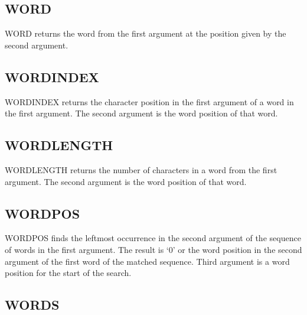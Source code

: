 

\subsection{WORD}\label{word}

WORD returns the word from the first argument at the position given by
the second argument.



\subsection{WORDINDEX}\label{wordindex}

WORDINDEX returns the character position in the first argument of a word
in the first argument. The second argument is the word position of that
word.



\subsection{WORDLENGTH}\label{wordlength}

WORDLENGTH returns the number of characters in a word from the first
argument. The second argument is the word position of that word.



\subsection{WORDPOS}\label{wordpos}

WORDPOS finds the leftmost occurrence in the second argument of the
sequence of words in the first argument. The result is `0' or the word
position in the second argument of the first word of the matched
sequence. Third argument is a word position for the start of the search.



\subsection{WORDS}\label{words}


